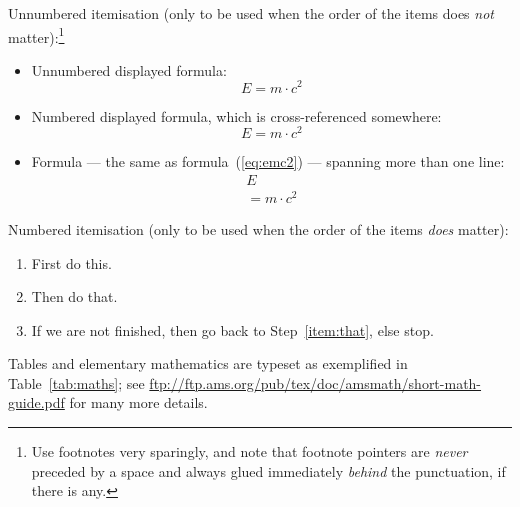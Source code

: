 Unnumbered itemisation (only to be used when the order of the items
does \emph{not} matter):\footnote{Use footnotes very sparingly, and
  note that footnote pointers are \emph{never} preceded by a space and
  always glued immediately \emph{behind} the punctuation, if there is
  any.}
\begin{itemize}
\item Unnumbered displayed formula:
  \[
  E = m \cdot c^2
  \]
\item Numbered displayed formula, which is cross-referenced somewhere:
  \begin{equation}
    \label{eq:emc2}
    E = m \cdot c^2
  \end{equation}
\item Formula --- the same as formula~(\ref{eq:emc2}) --- spanning
  more than one line:
  \begin{gather*}
    E \\ = m \cdot c^2
  \end{gather*}
\end{itemize}
Numbered itemisation (only to be used when the order of the items
\emph{does} matter):
\begin{enumerate}
\item First do this.
\item\label{item:that} Then do that.
\item If we are not finished, then go back to Step~\ref{item:that},
  else stop.
\end{enumerate}

Tables and elementary mathematics are typeset as exemplified in
Table~\ref{tab:maths}; see
\url{ftp://ftp.ams.org/pub/tex/doc/amsmath/short-math-guide.pdf} for
many more details.

